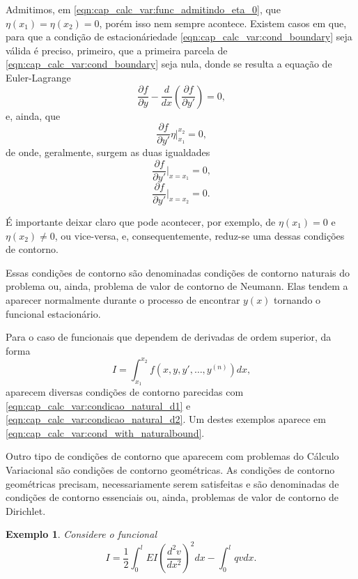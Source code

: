 \documentclass[
	12pt,				%
	openright,			%
    twoside,			%
	a4paper,			%
	english,			%
	french,				%
	spanish,			%
	brazil				%
	]{abntex2}
\newtheorem{exemplo}{Exemplo}
\numberwithin{lema}{chapter}
\numberwithin{teorema}{chapter}
\numberwithin{definicao}{chapter}
\numberwithin{exemplo}{chapter}
\numberwithin{figure}{chapter}
\begin{document}
\begin{apendicesenv}
{	Admitimos, em \eqref{eqn:cap_calc_var:func_admitindo_eta_0}, que $\eta(x_1)=\eta(x_2)=0$, porém isso nem sempre acontece. Existem casos em que, para que a condição de estacionáriedade \eqref{eqn:cap_calc_var:cond_boundary} seja válida é preciso, primeiro, que a primeira parcela de \eqref{eqn:cap_calc_var:cond_boundary} seja nula, donde se resulta a equação de Euler-Lagrange
	$$
		\frac{\partial f}{\partial y}
		-
		\frac{d}{dx}\left (
			\frac{\partial f}{\partial y'}
		\right )
		= 0
		\text{,}
	$$
	e, ainda, que
	$$
		\frac{\partial f}{\partial y'}\eta \Big |_{x_1}^{x_2} = 0
		\text{,}
	$$
	de onde, geralmente, surgem as duas igualdades
	\begin{equation}
		\label{eqn:cap_calc_var:condicao_natural_d1}
		\frac{\partial f}{\partial y'} \Big |_{x=x_1} = 0
		\text{,}
	\end{equation}
	\begin{equation}
		\label{eqn:cap_calc_var:condicao_natural_d2}
		\frac{\partial f}{\partial y'} \Big |_{x=x_2} = 0
		\text{.}
	\end{equation}
	
	É importante deixar claro que pode acontecer, por exemplo, de $\eta(x_1)=0$ e $\eta(x_2)\neq 0$, ou vice-versa, e, consequentemente, reduz-se uma dessas condições de contorno.
	
	Essas condições de contorno são denominadas condições de contorno naturais do problema ou, ainda, problema de valor de contorno de Neumann. Elas tendem a aparecer normalmente durante o processo de encontrar $y(x)$ tornando o funcional estacionário.
	
	Para o caso de funcionais que dependem de derivadas de ordem superior, da forma
	$$
		I=\int_{x_1}^{x_2} f(x, y, y', \dots, y^{(n)}) dx
		\text{,}
	$$
	aparecem diversas condições de contorno parecidas com \eqref{eqn:cap_calc_var:condicao_natural_d1} e \eqref{eqn:cap_calc_var:condicao_natural_d2}. Um destes exemplos aparece em \eqref{eqn:cap_calc_var:cond_with_naturalbound}.
	
	Outro tipo de condições de contorno que aparecem com problemas do Cálculo Variacional são condições de contorno geométricas. As condições de contorno geométricas precisam, necessariamente serem satisfeitas e são denominadas de condições de contorno essenciais ou, ainda, problemas de valor de contorno de Dirichlet.
	
	\begin{exemplo}
		\label{ex:cond_contorno}
		Considere o funcional
		\begin{equation}
			\label{eqn:cap_calc_var:funcional_pi}
			I = \frac{1}{2}	\int_{0}^{l}
				EI \left (
					\frac{d^2v}{dx^2}
				\right )^2 dx
				-
				\int_{0}^{l} qv dx
				\text{.}
		\end{equation}
		

\end{exemplo}}
\end{apendicesenv}
\end{document}
